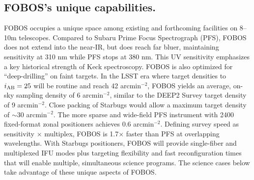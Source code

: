 \documentclass[oneside,11pt]{amsart}
\begin{document}
\subsection{FOBOS's unique capabilities.} FOBOS occupies a unique space among existing and forthcoming
facilities on 8--10m telescopes.  Compared to Subaru Prime Focus Spectrograph (PFS), FOBOS does not extend into the near-IR, but does reach far bluer, maintaining sensitivity at 310 nm while PFS stops at 380 nm.  This UV sensitivity emphasizes a key historical strength of Keck spectroscopy.  FOBOS is also optimized for ``deep-drilling'' on faint targets. In the LSST era where target densities to $i_{\rm AB} = 25$ will be routine and reach 42 arcmin$^{-2}$, FOBOS yields an average, on-sky sampling density of 6 arcmin$^{-2}$, similar to the DEEP2 Survey target density of 9 arcmin$^{-2}$.  Close packing of Starbugs would allow a maximum target density of $\sim$30 arcmin$^{-2}$.  The more sparse and wide-field PFS instrument with 2400 fixed-format zonal positioners achieves 0.6 arcmin$^{-2}$.  Defining survey speed as sensitivity $\times$ multiplex, FOBOS is 1.7$\times$ faster than PFS at overlapping wavelengths.  With Starbugs positioners, FOBOS will provide single-fiber and multiplexed IFU modes plus targeting flexibility and fast reconfiguration times that will enable multiple, simultaneous science programs.  The
science cases below take advantage of these unique aspects of FOBOS.















\begin{multicols}{2}
\scriptsize


\end{multicols}

\newpage




\end{document}
